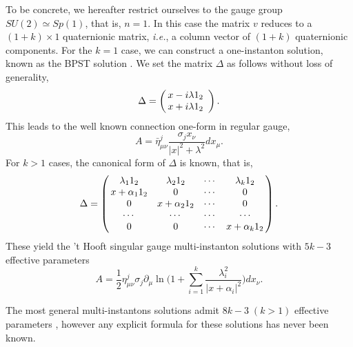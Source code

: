 \documentclass[a4paper,10pt]{article}
\newcommand{\ie}{\textit{i.e.}}
\begin{document}
To be concrete, we hereafter restrict ourselves to the gauge group  $SU(2) \simeq Sp(1)$, that is, $n=1$.
In this case the matrix $v$ reduces to a $(1+k) \times 1$ quaternionic matrix, \ie, a column vector of $(1+k)$ quaternionic components.
For the $k=1$ case, we can construct a one-instanton solution, known as the BPST solution \cite{BPST}.
We set the matrix $\Delta$ as follows without loss of generality, 
\begin{equation}
\Delta =\left(
        \begin{array}{@{\,}cc@{\,}}
        x-i\lambda 1_2 \\
        x+i\lambda 1_2
        \end{array}
        \right).
\end{equation}
This leads to the well known connection one-form in regular gauge,
\begin{equation}
A=\bar{\eta}^j_{\mu\nu}\frac{\sigma_jx_\nu}{|x|^2+\lambda^2}dx_\mu.
\end{equation}
For $k>1$ cases, the canonical form \cite{AHDM,EWein} of $\Delta$ is known, that is,
\begin{equation}
\Delta =\left(
        \begin{array}{@{\,}cccc@{\,}}
        \lambda_1  1_2 & \lambda_2  1_2 & \cdots & \lambda_k 1_2  \\
        x+\alpha_1 1_2 & 0              & \cdots & 0              \\
        0              & x+\alpha_2 1_2 & \cdots & 0              \\
        \cdots         & \cdots         & \cdots & \cdots         \\
        0              & 0              & \cdots & x+\alpha_k 1_2 \\
        \end{array}
        \right).
\end{equation}
These yield the 't Hooft singular gauge multi-instanton solutions with $5k-3$  effective parameters \cite{AHDM}
\begin{equation}
A=\frac{1}{2}{\eta}^j_{\mu\nu}\sigma_j\partial_\mu \ln \Biggl(1+\sum^k_{i=1}\frac{\lambda^2_i}{|x+\alpha_i|^2}\Biggr)dx_\nu. 
\end{equation}


The most general multi-instantons solutions admit $8k-3\;(k>1)$  effective parameters \cite{AHDM,DM}, however any explicit formula for these solutions has never been known.

\end{document}
